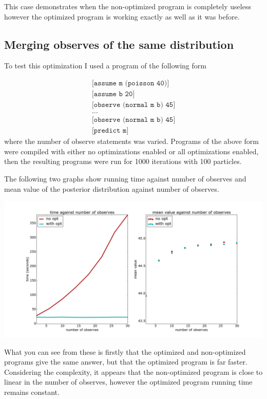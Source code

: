 \documentclass[a4paper]{article}
\begin{document}
This case demonstrates when the non-optimized program is completely useless however the optimized program is working exactly as well as it was before.




\subsection{Merging observes of the same distribution}

To test this optimization I used a program of the following form

\[
	\begin{array}{l}
		\texttt{[assume m (poisson 40)]} \\
		\texttt{[assume b 20]} \\
		\texttt{[observe (normal m b) 45]} \\
		\texttt{...} \\
		\texttt{[observe (normal m b) 45]} \\
		\texttt{[predict m]}
	\end{array}
\]
where the number of observe statements was varied. Programs of the above form were compiled with either no optimizations enabled or all optimizations enabled, then the resulting programs were run for 1000 iterations with 100 particles.

The following two graphs show running time against number of observes and mean value of the posterior distribution against number of observes.

\centerline{\includegraphics[width=16cm]{images/merging_observes_1.png}}

What you can see from these is firstly that the optimized and non-optimized programs give the same answer, but that the optimized program is far faster. Considering the complexity, it appears that the non-optimized program is close to linear in the number of observes, however the optimized program running time remains constant.
\end{document}
